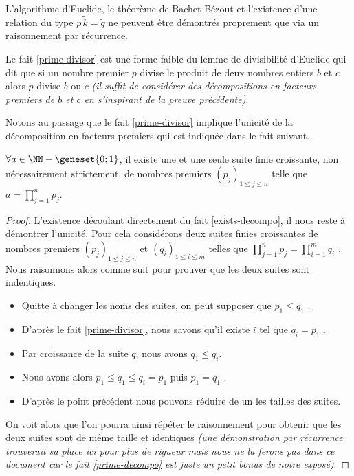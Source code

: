 \begin{unproved}
	L'algorithme d'Euclide, le théorème de Bachet-Bézout et l'existence d'une relation du type $p \, \widetilde{k} = \widetilde{q}$ ne peuvent être démontrés proprement que via un raisonnement par récurrence.

\end{unproved}


\begin{remark}
	Le fait \ref{prime-divisor} est une forme faible du lemme de divisibilité d'Euclide qui dit que si un nombre premier $p$ divise le produit de deux nombres entiers $b$ et $c$ alors $p$ divise $b$ ou $c$ \emph{(il suffit de considérer des décompositions en facteurs premiers de $b$ et $c$ en s'inspirant de la preuve précédente)}.  
\end{remark}


Notons au passage que le fait \ref{prime-divisor} implique l'unicité de la décomposition en facteurs premiers qui est indiquée dans le fait suivant.

\begin{fact} \label{prime-decompo}
	$\forall a \in \NN - \geneset{0 ; 1}$, il existe une et une seule suite finie croissante, non nécessairement strictement, de nombres premiers $(p_j)_{1 \leq j \leq n}$
	telle que $\displaystyle a = \prod_{j=1}^{n} p_j$. 
\end{fact}
	

\begin{proof}
	L'existence découlant directement du fait \ref{exists-decompo}, il nous reste à démontrer l'unicité.
	Pour cela considérons deux suites finies croissantes de nombres premiers
	$(p_j)_{1 \leq j \leq n}$
	et
	$(q_i)_{1 \leq i \leq m}$
	telles que $\displaystyle \prod_{j=1}^{n} p_j = \prod_{i=1}^{m} q_i$ .
	Nous raisonnons alors comme suit pour prouver que les deux suites sont indentiques.
	
	\begin{itemize}[label=\small\textbullet]
		\item Quitte à changer les noms des suites, on peut supposer que $p_1 \leq q_1$ .
		

		\item D'après le fait \ref{prime-divisor}, nous savons qu'il existe $i$ tel que $q_i = p_1$ .
	
		\item Par croissance de la suite $q$, nous avons $q_1 \leq q_i$.
		
		\item Nous avons alors $p_1 \leq q_1 \leq q_i = p_1$ puis $p_1 = q_1$ .
		
		\item D'après le point précédent nous pouvons réduire de un les tailles des suites.
	\end{itemize}
	
	On voit alors que l'on pourra ainsi répéter le raisonnement pour obtenir que les deux suites sont de même taille et identiques \emph{(une démonstration par récurrence trouverait sa place ici pour plus de rigueur mais nous ne la ferons pas dans ce document car le fait \ref{prime-decompo} est juste un petit bonus de notre exposé)}.
\end{proof}
